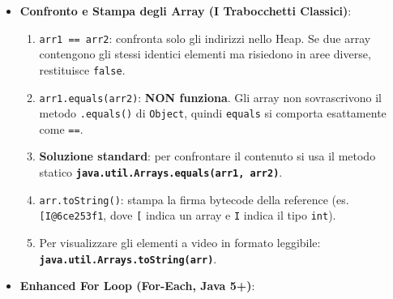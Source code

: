 \documentclass[11pt,a4paper]{article}
\newcommand{\passthrough}[1]{#1}
\providecommand{\tightlist}{\setlength{\itemsep}{0pt}\setlength{\parskip}{0pt}}
\begin{document}
\begin{itemize}
  \begin{itemize}
  \tightlist
  \item
    Ogni array possiede la proprietà
    \passthrough{\lstinline!public final int length!}.
  \item
    Attenzione: \textbf{Distinzione d'esame}: per gli array si scrive
    \passthrough{\lstinline!arr.length!} (\textbf{senza parentesi}, è
    una variabile \passthrough{\lstinline!final!}), mentre per le
    stringhe si invoca il metodo \passthrough{\lstinline!str.length()!}
    (\textbf{con le parentesi}).
  \item
    Se si tenta di leggere \passthrough{\lstinline!arr.length!} su un
    array nullo (\passthrough{\lstinline!arr = null;!}), la JVM lancia
    una \passthrough{\lstinline!NullPointerException!}.
  \end{itemize}
\item
  \textbf{Confronto e Stampa degli Array (I Trabocchetti Classici)}:

  \begin{enumerate}
  \def\labelenumi{\arabic{enumi}.}
  \tightlist
  \item
    \passthrough{\lstinline!arr1 == arr2!}: confronta solo gli indirizzi
    nello Heap. Se due array contengono gli stessi identici elementi ma
    risiedono in aree diverse, restituisce
    \passthrough{\lstinline!false!}.
  \item
    \passthrough{\lstinline!arr1.equals(arr2)!}: \textbf{NON funziona}.
    Gli array non sovrascrivono il metodo
    \passthrough{\lstinline!.equals()!} di
    \passthrough{\lstinline!Object!}, quindi
    \passthrough{\lstinline!equals!} si comporta esattamente come
    \passthrough{\lstinline!==!}.
  \item
    \textbf{Soluzione standard}: per confrontare il contenuto si usa il
    metodo statico
    \textbf{\passthrough{\lstinline!java.util.Arrays.equals(arr1, arr2)!}}.
  \item
    \passthrough{\lstinline!arr.toString()!}: stampa la firma bytecode
    della reference (es. \passthrough{\lstinline![I@6ce253f1!}, dove
    \passthrough{\lstinline![!} indica un array e
    \passthrough{\lstinline!I!} indica il tipo
    \passthrough{\lstinline!int!}).
  \item
    Per visualizzare gli elementi a video in formato leggibile:
    \textbf{\passthrough{\lstinline!java.util.Arrays.toString(arr)!}}.
  \end{enumerate}
\item
  \textbf{Enhanced For Loop (For-Each, Java 5+)}:


\end{itemize}
\end{document}
